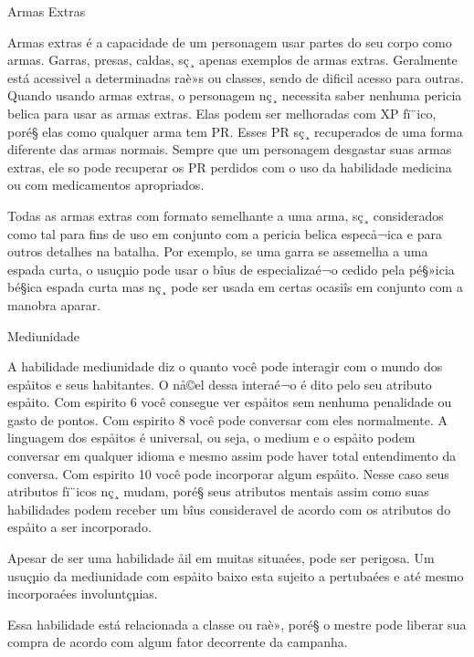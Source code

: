  
Armas Extras
 
Armas extras é a capacidade de um personagem usar partes do seu corpo como armas. Garras, presas, caldas, sç¸ apenas exemplos de armas extras. Geralmente está acessivel a determinadas raè»s ou classes, sendo de dificil acesso para outras. Quando usando armas extras, o personagem nç¸ necessita saber nenhuma pericia belica para usar as armas extras. Elas podem ser melhoradas com XP fï¨ico, poré§ elas como qualquer arma tem PR. Esses PR sç¸ recuperados de uma forma diferente das armas normais. Sempre que um personagem desgastar suas armas extras, ele so pode recuperar os PR perdidos com o uso da habilidade medicina ou com medicamentos apropriados.

Todas as armas extras com formato semelhante a uma arma, sç¸ considerados como tal para fins de uso em conjunto com a pericia belica especå¬ica e para outros detalhes na batalha. Por exemplo, se uma garra se assemelha a uma espada curta, o usuçµio pode usar o bîus de especializaé¬o cedido pela pé§»icia bé§ica espada curta mas nç¸ pode ser usada em certas ocasiîs em conjunto com a manobra aparar.
 
Mediunidade
 
 A habilidade mediunidade diz o quanto você pode interagir com o mundo dos espåitos e seus habitantes. O nå©el dessa interaé¬o é dito pelo seu atributo espåito. Com espirito 6 você consegue ver espåitos sem nenhuma penalidade ou gasto de pontos. Com espirito 8 você pode conversar com eles normalmente. A linguagem dos espåitos é universal, ou seja, o medium e o espåito podem conversar em qualquer idioma e mesmo assim pode haver total entendimento da conversa. Com espirito 10 você pode incorporar algum espåito. Nesse caso seus atributos fï¨icos nç¸ mudam, poré§ seus atributos mentais assim como suas habilidades podem receber um bîus consideravel de acordo com os atributos do espåito a ser incorporado.
 
Apesar de ser uma habilidade åil em muitas situaées, pode ser perigosa. Um usuçµio da mediunidade com espåito baixo esta sujeito a pertubaées e até mesmo incorporaées involuntçµias.

Essa habilidade está relacionada a classe ou raè», poré§ o mestre pode liberar sua compra de acordo com algum fator decorrente da campanha. 

